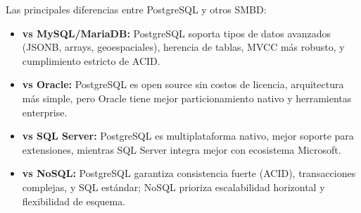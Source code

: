 \item
Las principales diferencias entre PostgreSQL y otros SMBD:

\begin{itemize}
	\item \textbf{vs MySQL/MariaDB:} PostgreSQL soporta tipos de datos avanzados (JSONB, arrays, geoespaciales), herencia de tablas, MVCC más robusto, y cumplimiento estricto de ACID.
	\item \textbf{vs Oracle:} PostgreSQL es open source sin costos de licencia, arquitectura más simple, pero Oracle tiene mejor particionamiento nativo y herramientas enterprise.
	\item \textbf{vs SQL Server:} PostgreSQL es multiplataforma nativo, mejor soporte para extensiones, mientras SQL Server integra mejor con ecosistema Microsoft.
	\item \textbf{vs NoSQL:} PostgreSQL garantiza consistencia fuerte (ACID), transacciones complejas, y SQL estándar; NoSQL prioriza escalabilidad horizontal y flexibilidad de esquema.
\end{itemize}
